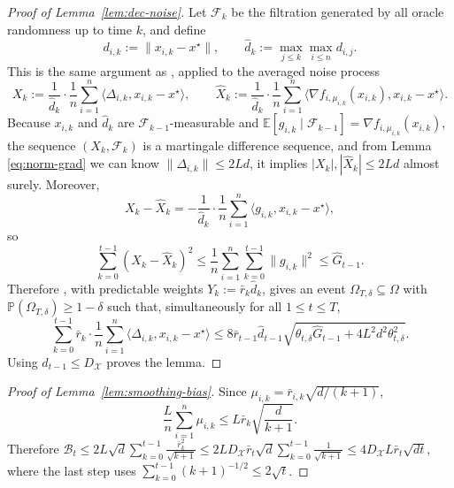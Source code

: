 \documentclass[runningheads]{llncs}
\newcommand{\Prob}{\mathbb{P}}
\begin{document}
\begin{proof}[Proof of Lemma~\ref{lem:dec-noise}]
Let \(\mathcal{F}_k\) be the filtration generated by all oracle randomness up
to time \(k\), and define
\[
d_{i,k}:=\|x_{i,k}-x^\star\|,
\qquad
\hat d_k:=\max_{j\le k}\max_{i\le n} d_{i,j}.
\]
This is the same argument as \cite[Lemma~5]{renparameter}, applied to the averaged
noise process
\[
X_k
:=
\frac{1}{\hat d_k}\cdot \frac1n\sum_{i=1}^n \langle \Delta_{i,k},x_{i,k}-x^\star\rangle,
\qquad
\widehat X_k
:=
\frac{1}{\hat d_k}\cdot \frac1n\sum_{i=1}^n
\langle \nabla f_{i,\mu_{i,k}}(x_{i,k}),x_{i,k}-x^\star\rangle.
\]
Because \(x_{i,k}\) and \(\hat d_k\) are \(\mathcal F_{k-1}\)-measurable and
\(\mathbb E[g_{i,k}\mid\mathcal F_{k-1}]
=\nabla f_{i,\mu_{i,k}}(x_{i,k})\), the sequence
\((X_k,\mathcal F_k)\) is a martingale difference sequence, and from Lemma \ref{eq:norm-grad}
we can know \(\|\Delta_{i,k}\|\le 2Ld\), it implies \(|X_k|,|\widehat X_k|\le 2Ld\) almost
surely. Moreover,
\[
X_k-\widehat X_k
=
-\frac{1}{\hat d_k}\cdot \frac1n\sum_{i=1}^n \langle g_{i,k},x_{i,k}-x^\star\rangle,
\]
so
\[
\sum_{k=0}^{t-1}(X_k-\widehat X_k)^2
\le
\frac{1}{n}\sum_{i=1}^n \sum_{k=0}^{t-1}\|g_{i,k}\|^2
\le
\hat G_{t-1}.
\]
Therefore \cite[Lemma~5]{renparameter}, with predictable weights
\(Y_k:=\bar r_k\hat d_k\), gives an event \(\Omega_{T,\delta}\subseteq \Omega\) with
\(\Prob(\Omega_{T,\delta})\ge 1-\delta\) such that, simultaneously for all
\(1\le t\le T\),
\[
\sum_{k=0}^{t-1}\bar r_k\cdot \frac1n\sum_{i=1}^n
\langle \Delta_{i,k},x_{i,k}-x^\star\rangle
\le
8\bar r_{t-1}\hat d_{t-1}
\sqrt{\theta_{t,\delta}\hat G_{t-1}+4L^2d^2\theta_{t,\delta}^2}.
\]
Using \(\hat d_{t-1}\le D_{\mathcal{X}}\) proves the lemma.
\end{proof}

\begin{proof}[Proof of Lemma~\ref{lem:smoothing-bias}]
Since \(\mu_{i,k}=\bar r_{i,k}\sqrt{d/(k+1)}\),
\[
\frac{L}{n}\sum_{i=1}^{n}\mu_{i,k}
\le
L\bar r_k\sqrt{\frac{d}{k+1}}.
\]
Therefore
$\mathcal B_t
\le
2L\sqrt d\sum_{k=0}^{t-1}\frac{\bar r_k^2}{\sqrt{k+1}} 
\le
2L D_{\mathcal{X}}\bar r_t\sqrt d\sum_{k=0}^{t-1}\frac{1}{\sqrt{k+1}} 
\le
4D_{\mathcal{X}}L\bar r_t\sqrt{dt},
$
where the last step uses
\(\sum_{k=0}^{t-1}(k+1)^{-1/2}\le 2\sqrt t\).
\end{proof}
\end{document}
